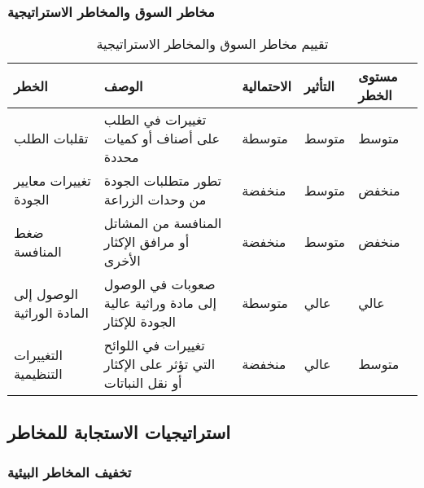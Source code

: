 \subsubsection{مخاطر السوق والمخاطر الاستراتيجية}

\begin{table}[h]
\centering
\begin{tabular}{|p{4cm}|p{4cm}|p{2cm}|p{2cm}|p{3cm}|}
\hline
\textbf{الخطر} & \textbf{الوصف} & \textbf{الاحتمالية} & \textbf{التأثير} & \textbf{مستوى الخطر} \\
\hline
تقلبات الطلب & تغييرات في الطلب على أصناف أو كميات محددة & متوسطة & متوسط & متوسط \\
\hline
تغييرات معايير الجودة & تطور متطلبات الجودة من وحدات الزراعة & منخفضة & متوسط & منخفض \\
\hline
ضغط المنافسة & المنافسة من المشاتل أو مرافق الإكثار الأخرى & منخفضة & متوسط & منخفض \\
\hline
الوصول إلى المادة الوراثية & صعوبات في الوصول إلى مادة وراثية عالية الجودة للإكثار & متوسطة & عالي & عالي \\
\hline
التغييرات التنظيمية & تغييرات في اللوائح التي تؤثر على الإكثار أو نقل النباتات & منخفضة & عالي & متوسط \\
\hline
\end{tabular}
\caption{تقييم مخاطر السوق والمخاطر الاستراتيجية}
\end{table}

\subsection{استراتيجيات الاستجابة للمخاطر}

\subsubsection{تخفيف المخاطر البيئية}

